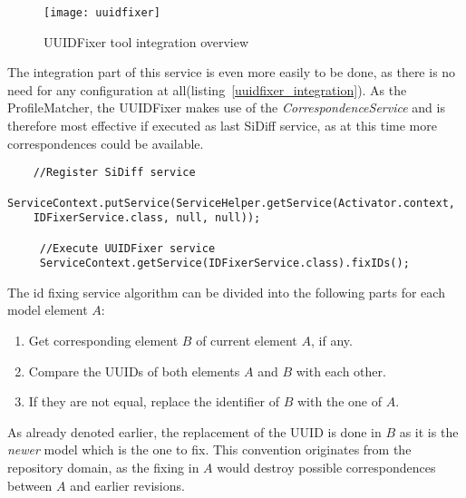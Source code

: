  \begin{figure}[h!]
\begin{center}
\texttt{[image: uuidfixer]}\\
\end{center}
\caption{\ac{UUID}Fixer tool integration overview}
\label{uuidfixer}
\end{figure}

The integration part of this service is even more easily to be done, as there is
no need for any configuration at all(listing~\ref{uuidfixer_integration}). As
the ProfileMatcher, the \ac{UUID}Fixer makes use of the
\textit{CorrespondenceService} and is therefore most effective if executed as
last SiDiff service, as at this time more correspondences could be available.

    \begin{lstlisting}				
    //Register SiDiff service
  	ServiceContext.putService(ServiceHelper.getService(Activator.context,
  	IDFixerService.class, null, null));
					
 	 //Execute UUIDFixer service					
	 ServiceContext.getService(IDFixerService.class).fixIDs();\end{lstlisting}

The id fixing service algorithm can be divided into the following parts for each
model element $A$:
\begin{enumerate}
  \item Get corresponding element $B$ of current element $A$, if any.
  \item Compare the \ac{UUID}s of both elements $A$ and $B$ with each other.
  \item If they are not equal, replace the identifier of $B$ with the one of
  $A$.
\end{enumerate} 
As already denoted earlier, the replacement of the \ac{UUID} is done
in $B$ as it is the \textit{newer} model which is the one to fix. This
convention originates from the repository domain, as the fixing in $A$ would destroy
possible correspondences between $A$ and earlier revisions.
